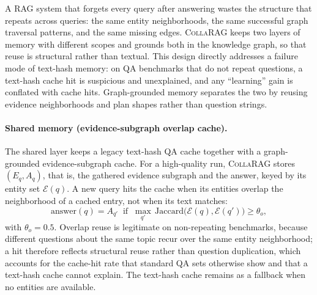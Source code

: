 \documentclass[11pt,a4paper]{article}
\newcommand{\sys}{\textsc{CollaRAG}}
\begin{document}
A RAG system that forgets every query after answering wastes the structure that repeats across queries: the same entity neighborhoods, the same successful graph traversal patterns, and the same missing edges.
\sys{} keeps two layers of memory with different scopes and grounds both in the knowledge graph, so that reuse is structural rather than textual.
This design directly addresses a failure mode of text-hash memory: on QA benchmarks that do not repeat questions, a text-hash cache hit is suspicious and unexplained, and any ``learning'' gain is conflated with cache hits.
Graph-grounded memory separates the two by reusing evidence neighborhoods and plan shapes rather than question strings.

\paragraph{Shared memory (evidence-subgraph overlap cache).}
The shared layer keeps a legacy text-hash QA cache together with a graph-grounded evidence-subgraph cache.
For a high-quality run, \sys{} stores $(E_q, A_q)$, that is, the gathered evidence subgraph and the answer, keyed by its entity set $\mathcal{E}(q)$.
A new query hits the cache when its entities overlap the neighborhood of a cached entry, not when its text matches:
\begin{equation}
\mathrm{answer}(q)=A_{q'}\;\;\text{if}\;\;\max_{q'}\,\mathrm{Jaccard}\bigl(\mathcal{E}(q),\mathcal{E}(q')\bigr)\ge\theta_{o},
\label{eq:cache}
\end{equation}
with $\theta_{o}{=}0.5$.
Overlap reuse is legitimate on non-repeating benchmarks, because different questions about the same topic recur over the same entity neighborhood; a hit therefore reflects structural reuse rather than question duplication, which accounts for the cache-hit rate that standard QA sets otherwise show and that a text-hash cache cannot explain.
The text-hash cache remains as a fallback when no entities are available.
\end{document}
